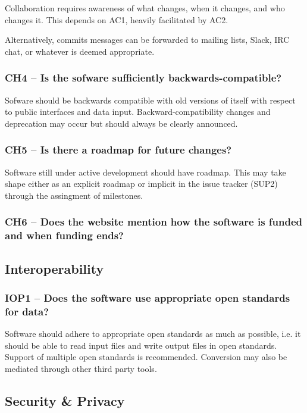 \documentclass[a4paper,11pt]{article}
\begin{document}
Collaboration requires awareness of what changes, when it changes, and who
changes it. This depends on AC1, heavily facilitated by AC2.

Alternatively, commits messages can be forwarded to mailing lists, Slack, IRC chat, or
whatever is deemed appropriate.

\subsubsection{CH4 -- Is the sofware sufficiently backwards-compatible?}

Sofware should be backwards compatible with old versions of itself with respect
to public interfaces and data input. Backward-compatibility changes and
deprecation may occur but should always be clearly announced.

\subsubsection{CH5 -- Is there a roadmap for future changes?}

Software still under active development should have roadmap. This may take
shape either as an explicit roadmap or implicit in the issue tracker
(SUP2) through the assingment of milestones.

\subsubsection{CH6 -- Does the website mention how the software is funded and
when funding ends?}


\subsection{Interoperability}

\subsubsection{IOP1 -- Does the software use appropriate open standards for data?}

Software should adhere to appropriate open standards as much as possible, i.e.
it should be able to read input files and write output files in open
standards. Support of multiple open standards is recommended. Conversion may
also be mediated through other third party tools.

\subsection{Security \& Privacy}
\end{document}
